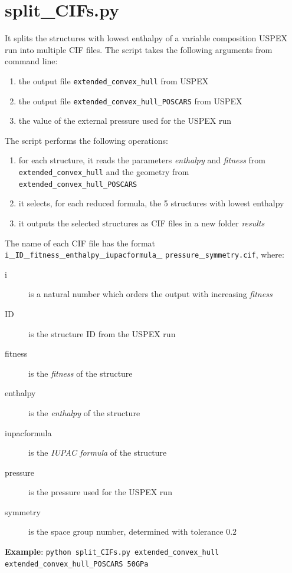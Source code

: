 \documentclass{article}
\begin{document}
\section{split\_CIFs.py}
It splits the structures with lowest enthalpy of a variable composition USPEX run into multiple CIF files. The script takes the following arguments from command line:
\begin{enumerate}
	\item the output file \texttt{extended\_convex\_hull} from USPEX
	\item the output file \texttt{extended\_convex\_hull\_POSCARS} from USPEX
	\item the value of the external pressure used for the USPEX run
\end{enumerate}
The script performs the following operations:
\begin{enumerate}
	\item for each structure, it reads the parameters \emph{enthalpy} and \emph{fitness} from \texttt{extended\_convex\_hull} and the geometry from \texttt{extended\_convex\_hull\_POSCARS}
	\item it selects, for each reduced formula, the 5 structures with lowest enthalpy
	\item it outputs the selected structures as CIF files in a new folder \textit{results}
\end{enumerate}
The name of each CIF file has the format \texttt{i}\_\texttt{ID}\_\texttt{fitness}\_\texttt{enthalpy}\_\texttt{iupacformula}\_ \texttt{pressure}\_\texttt{symmetry.cif}, where:
\begin{description}
	\item[i] is a natural number which orders the output with increasing \emph{fitness}
	\item[ID] is the structure ID from the USPEX run
	\item[fitness] is the \emph{fitness} of the structure
	\item[enthalpy] is the \emph{enthalpy} of the structure
	\item[iupacformula] is the \emph{IUPAC formula} of the structure
	\item[pressure] is the pressure used for the USPEX run
	\item[symmetry] is the space group number, determined with tolerance $0.2$\end{description}
\textbf{Example}: \texttt{python split\_CIFs.py extended\_convex\_hull \\ extended\_convex\_hull\_POSCARS 50GPa}
\end{document}
